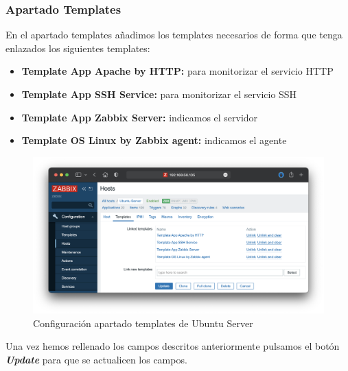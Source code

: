 \subsubsection{Apartado Templates}
En el apartado templates añadimos los templates necesarios de forma que tenga enlazados los siguientes templates:
    \begin{itemize}
        \item \textbf{Template App Apache by HTTP:} para monitorizar el servicio HTTP
        \item \textbf{Template App SSH Service:} para monitorizar el servicio SSH
        \item \textbf{Template App Zabbix Server:} indicamos el servidor
        \item \textbf{Template OS Linux by Zabbix agent:} indicamos el agente
    \end{itemize}
    \begin{figure}[H]
        \centering
        \includegraphics[scale=0.4225]{images/ubuntu_templates.png}
        \caption{Configuración apartado templates de Ubuntu Server}
        \label{fig:ubuntu_templates}
    \end{figure}
Una vez hemos rellenado los campos descritos anteriormente pulsamos el botón \textbf{\emph{Update}} para que se actualicen los campos.

